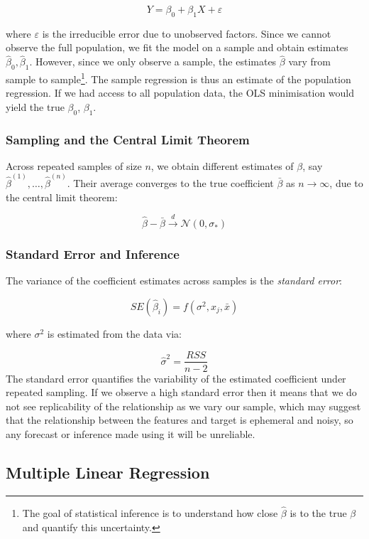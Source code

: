 \documentclass[9pt]{extarticle}
\begin{document}
\[
Y = \beta_0 + \beta_1 X + \varepsilon
\]


where $\varepsilon$ is the irreducible error due to unobserved factors. Since we cannot observe the full population, we fit the model on a sample and obtain estimates $\hat{\beta}_0, \hat{\beta}_1$.
However, since we only observe a sample, the estimates $\hat{\beta}$ vary
from sample to sample\footnote{
 The goal of statistical inference is to understand 
how close $\hat{\beta}$ is to the true $\beta$ and quantify this uncertainty.}.
The sample regression is thus an estimate of the population regression. 
If we had access to all population data, the OLS minimisation would yield the true $\beta_0$, $\beta_1$.


\subsubsection*{Sampling and the Central Limit Theorem}

Across repeated samples of size $n$, we obtain different estimates of $\beta$, say $\hat{\beta}^{(1)}, \dots, \hat{\beta}^{(n)}$. Their average converges to the true coefficient $\bar{\beta}$ as $n \to \infty$, due to the central limit theorem:

\[
\hat{\beta} - \bar{\beta} \xrightarrow{d} \mathcal{N}(0, \sigma_*)
\]

\subsubsection*{Standard Error and Inference}

The variance of the coefficient estimates across samples is the \emph{standard error}:

$$SE(\hat{\beta}_i) = f(\sigma^2, x_j, \bar{x})$$

where $\sigma^2$ is estimated from the data via:

\[
\hat{\sigma}^2 = \frac{RSS}{n - 2}
\]
The standard error quantifies the variability of the estimated coefficient 
under repeated sampling. If we observe a high standard error then it means that we do not see 
replicability of the relationship as we vary our sample, which may suggest that 
the relationship between the features and target is ephemeral and noisy, so 
any forecast or inference made using it will be unreliable.

\subsection{Multiple Linear Regression}
\end{document}
